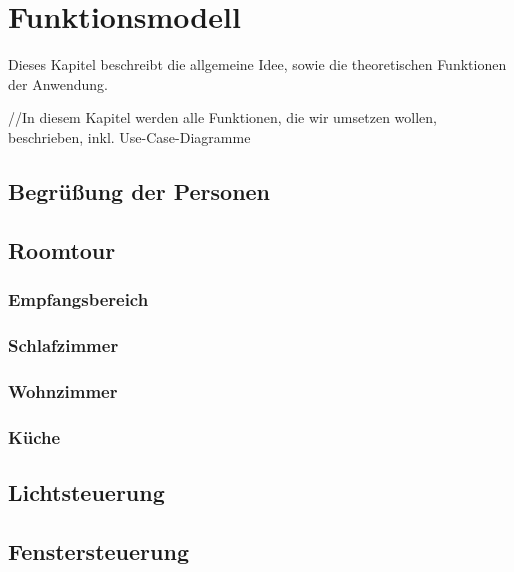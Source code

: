 \chapter{Funktionsmodell}
Dieses Kapitel beschreibt die allgemeine Idee, sowie die theoretischen Funktionen der Anwendung.

//In diesem Kapitel werden alle Funktionen, die wir umsetzen wollen, beschrieben, inkl. Use-Case-Diagramme

\section{Begrüßung der Personen}


\section{Roomtour}

\subsection{Empfangsbereich}

\subsection{Schlafzimmer}

\subsection{Wohnzimmer}

\subsection{Küche}

\section{Lichtsteuerung}

\section{Fenstersteuerung}